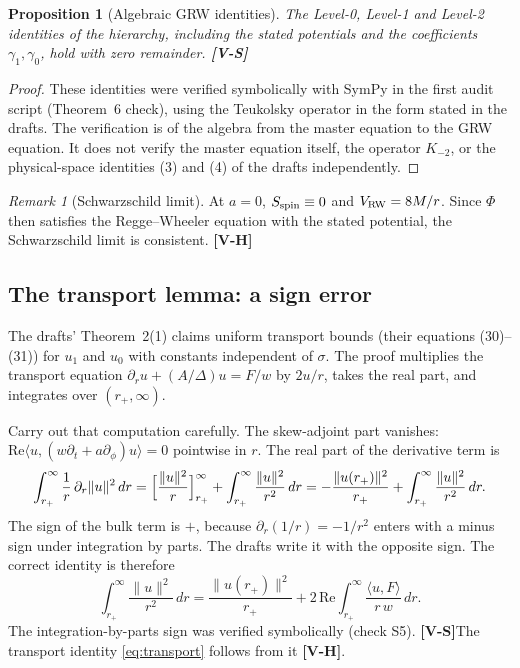 \documentclass[11pt, a4paper]{article}
\newcommand{\VS}{\textcolor{vs}{\textbf{[V-S]}}}
\newcommand{\VH}{\textcolor{vh}{\textbf{[V-H]}}}
\newtheorem{proposition}[theorem]{Proposition}
\theoremstyle{remark}
\newtheorem{remark}[theorem]{Remark}
\theoremstyle{definition}
\begin{document}
\begin{proposition}[Algebraic GRW identities]
\label{prop:grw}
The Level-0, Level-1 and Level-2 identities of the hierarchy, including the stated potentials and the coefficients $\gamma_1,\gamma_0$, hold with zero remainder. \VS
\end{proposition}

\begin{proof}
These identities were verified symbolically with SymPy in the first audit script (Theorem~6 check), using the Teukolsky operator in the form stated in the drafts. The verification is of the algebra from the master equation to the GRW equation. It does not verify the master equation itself, the operator $K_{-2}$, or the physical-space identities (3) and (4) of the drafts independently.
\end{proof}

\begin{remark}[Schwarzschild limit]
At $a=0$, $S_{\rm spin}\equiv 0$ and $V_{\rm RW} = 8M/r$. Since $\Phi$ then satisfies the Regge--Wheeler equation with the stated potential, the Schwarzschild limit is consistent. \VH
\end{remark}

\subsection{The transport lemma: a sign error}

The drafts' Theorem~2(1) claims uniform transport bounds (their equations (30)--(31)) for $u_1$ and $u_0$ with constants independent of $\sigma$. The proof multiplies the transport equation $\partial_r u + (A/\Delta)u = F/w$ by $2u/r$, takes the real part, and integrates over $(r_+,\infty)$.

Carry out that computation carefully. The skew-adjoint part vanishes: $\mathrm{Re}\langle u, (w\partial_t + a\partial_\phi)u\rangle = 0$ pointwise in $r$. The real part of the derivative term is
\[
\int_{r_+}^\infty \frac{1}{r}\,\partial_r\|u\|^2\,dr = \Bigl[\frac{\|u\|^2}{r}\Bigr]_{r_+}^\infty + \int_{r_+}^\infty\frac{\|u\|^2}{r^2}\,dr = -\frac{\|u(r_+)\|^2}{r_+} + \int_{r_+}^\infty \frac{\|u\|^2}{r^2}\,dr.
\]
The sign of the bulk term is $+$, because $\partial_r(1/r) = -1/r^2$ enters with a minus sign under integration by parts. The drafts write it with the opposite sign. The correct identity is therefore
\begin{equation}
\int_{r_+}^\infty \frac{\|u\|^2}{r^2}\,dr = \frac{\|u(r_+)\|^2}{r_+} + 2\,\mathrm{Re}\int_{r_+}^\infty \frac{\langle u,F\rangle}{r\,w}\,dr. \label{eq:transport}
\end{equation}
The integration-by-parts sign was verified symbolically (check S5). \VS The transport identity \eqref{eq:transport} follows from it \VH.
\end{document}
